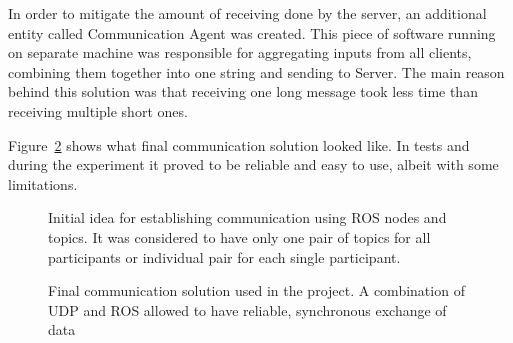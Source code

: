 \documentclass[11pt,english]{article}
\begin{document}
\par
In order to mitigate the amount of receiving done by the server, an additional entity called Communication Agent was created. This piece of software running on separate machine was responsible for aggregating inputs from all clients, combining them together into one string and sending to Server. The main reason behind this solution was that receiving one long message took less time than receiving multiple short ones. 
\par
Figure~\ref{fig:ros_final} shows what final communication solution looked like. In tests and during the experiment it proved to be reliable and easy to use, albeit with some limitations.

\begin{figure}[!] 
\caption{Initial idea for establishing communication using ROS nodes and topics. It was considered to have only one pair of topics for all participants or individual pair for each single participant.}
\label{fig:ros_initial_idea}
\end{figure} 


\begin{figure}[!] 
\caption{Final communication solution used in the project. A combination of UDP and ROS allowed to have reliable, synchronous exchange of data}
\label{fig:ros_final}
\end{figure} 
\end{document}
